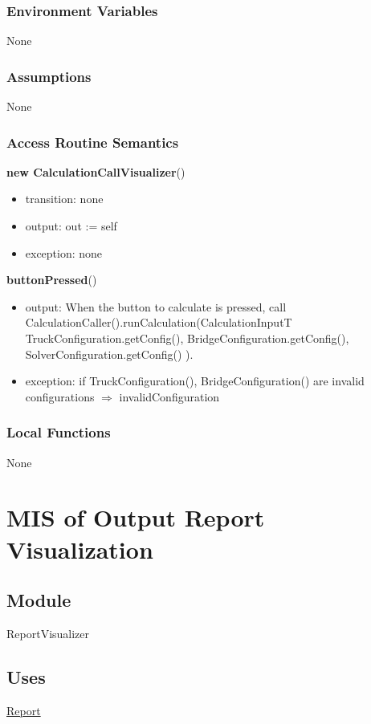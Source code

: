 \documentclass[12pt, titlepage]{article}
\begin{document}
\subsubsection{Environment Variables}
None
\subsubsection{Assumptions}
None
\subsubsection{Access Routine Semantics}

\noindent \textbf{new CalculationCallVisualizer}()
\begin{itemize}
\item transition: none
\item output: out := self
\item exception: none
\end{itemize}

\noindent \textbf{buttonPressed}()
\begin{itemize}
\item output: When the button to calculate is pressed, call CalculationCaller().runCalculation(CalculationInputT { TruckConfiguration.getConfig(), BridgeConfiguration.getConfig(), SolverConfiguration.getConfig() }).
\item exception: if TruckConfiguration(), BridgeConfiguration() are invalid configurations $\Rightarrow$ invalidConfiguration
\end{itemize}
\subsubsection{Local Functions}
None

\newpage
\section{MIS of Output Report Visualization} \label{ReportVisualizer}

\subsection{Module}

ReportVisualizer

\subsection{Uses}
\hyperref[Report]{Report}
\end{document}
